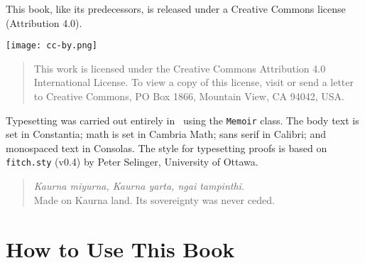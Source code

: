 This book, like its predecessors, is released under a Creative Commons license (Attribution 4.0).\medskip 

\begin{center}
	\texttt{[image: cc-by.png]} 
\end{center}

\begin{quote}
	{\small This work is licensed under the Creative Commons Attribution 4.0 International License. To view a copy of this license, visit  or send a letter to Creative Commons, PO Box 1866, Mountain View, CA 94042, USA.} 
\end{quote} \medskip


\vfill

Typesetting was carried out entirely in \XeLaTeX\ using the \texttt{Memoir} class. The body text is set in Constantia; math is set in Cambria Math; sans serif in Calibri; and monospaced text in Consolas. The style for typesetting proofs is based on \texttt{fitch.sty} (v0.4) by Peter Selinger, University of Ottawa.

\begin{quote}
	\emph{Kaurna miyurna, Kaurna yarta, ngai tampinthi.}\\
	Made on Kaurna land. Its sovereignty was never ceded.
\end{quote}

\newpage
\tableofcontents*\newpage
\listoffigures*

\chapter*{How to Use This Book}

